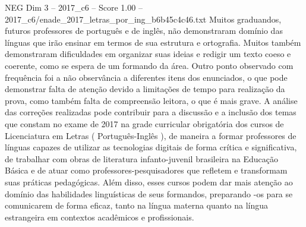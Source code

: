 \begin{textsample}{NEG Dim 3 – 2017\_c6 – Score 1.00 – 2017\_c6/enade\_2017\_letras\_por\_ing\_b6b45c4c46.txt}
Muitos graduandos, futuros professores de português e de inglês, não demonstraram domínio das línguas que irão ensinar em termos de sua estrutura e ortografia.
Muitos também demonstraram dificuldades em organizar suas ideias e redigir um texto coeso e coerente, como se espera de um formando da área.
Outro ponto observado com frequência foi a não observância a diferentes itens dos enunciados, o que pode demonstrar falta de atenção devido a limitações de tempo para realização da prova, como também falta de compreensão leitora, o que é mais grave.
A análise das correções realizadas pode contribuir para a discussão e a inclusão dos temas que constam no exame de 2017 na grade curricular obrigatória dos cursos de Licenciatura em Letras ( Português-Inglês ), de maneira a formar professores de línguas capazes de utilizar as tecnologias digitais de forma crítica e significativa, de trabalhar com obras de literatura infanto-juvenil brasileira na Educação Básica e de atuar como professores-pesquisadores que refletem e transformam suas práticas pedagógicas.
Além disso, esses cursos podem dar mais atenção ao domínio das habilidades linguísticas de seus formandos, preparando -os para se comunicarem de forma eficaz, tanto na língua materna quanto na língua estrangeira em contextos acadêmicos e profissionais.

\end{textsample}
